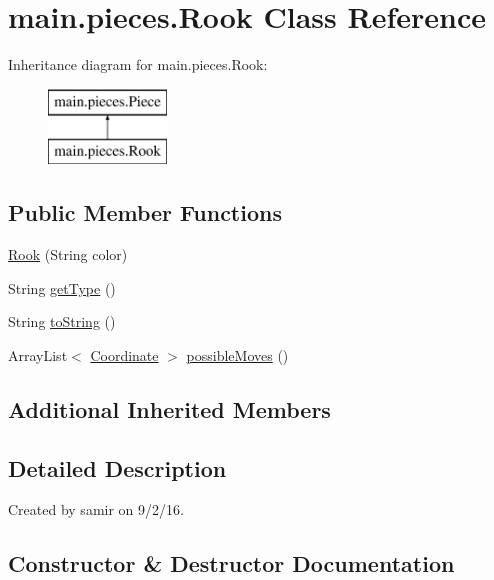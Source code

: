 \hypertarget{classmain_1_1pieces_1_1_rook}{}\section{main.\+pieces.\+Rook Class Reference}
\label{classmain_1_1pieces_1_1_rook}
Inheritance diagram for main.\+pieces.\+Rook\+:\begin{figure}[H]
\begin{center}
\leavevmode
\includegraphics[height=2.000000cm]{classmain_1_1pieces_1_1_rook}
\end{center}
\end{figure}
\subsection*{Public Member Functions}
\begin{DoxyCompactItemize}
\item 
\hyperlink{classmain_1_1pieces_1_1_rook_af43778247abc01b02f8bd7f1bc7ecb17}{Rook} (String color)
\item 
String \hyperlink{classmain_1_1pieces_1_1_rook_aa92d82c81ad259daa0a3722e6bba870c}{get\+Type} ()
\item 
String \hyperlink{classmain_1_1pieces_1_1_rook_aa4408e34efd361045d25687da3103103}{to\+String} ()
\item 
Array\+List$<$ \hyperlink{classmain_1_1model_1_1_coordinate}{Coordinate} $>$ \hyperlink{classmain_1_1pieces_1_1_rook_acadd8cb22ffb2aef8ce68502b221a96e}{possible\+Moves} ()
\end{DoxyCompactItemize}
\subsection*{Additional Inherited Members}


\subsection{Detailed Description}
Created by samir on 9/2/16. 

\subsection{Constructor \& Destructor Documentation}
\hypertarget{classmain_1_1pieces_1_1_rook_af43778247abc01b02f8bd7f1bc7ecb17}{}\label{classmain_1_1pieces_1_1_rook_af43778247abc01b02f8bd7f1bc7ecb17} 
